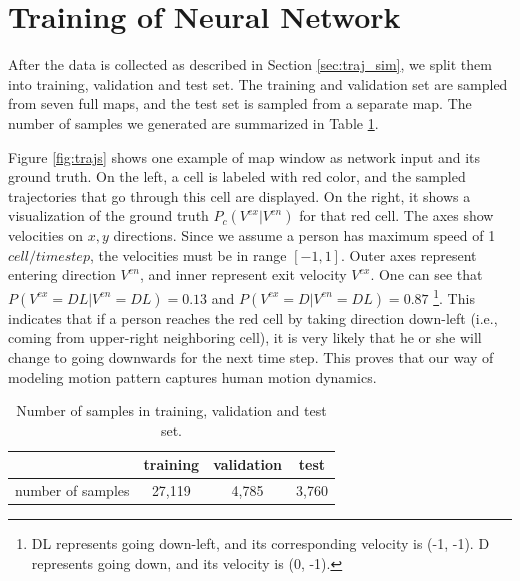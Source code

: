 \section{Training of Neural Network} \label{sec:train_cnn}

After the data is collected as described in Section \ref{sec:traj_sim}, we split them into training, validation and test set. The training and validation set are sampled from seven full maps, and the test set is sampled from a separate map. The number of samples we generated are summarized in Table \ref{table:nos}. 

Figure \ref{fig:trajs} shows one example of map window as network input and its ground truth. On the left, a cell is labeled with red color, and the sampled trajectories that go through this cell are displayed. On the right, it shows a visualization of the ground truth \( P_c(V^{ex} | V^{en}) \) for that red cell. The axes show velocities on \( x, y\) directions. Since we assume a person has maximum speed of 1 $cell/timestep$, the velocities must be in range $[-1,1]$. Outer axes represent entering direction \( V^{en} \), and inner represent exit velocity \( V^{ex} \). One can see that \( P(V^{ex}=DL | V^{en}=DL) = 0.13 \) and \( P(V^{ex}=D | V^{en}=DL) = 0.87 \) \footnote{DL represents going down-left, and its corresponding velocity is (-1, -1). D represents going down, and its velocity is (0, -1).}. This indicates that if a person reaches the red cell by taking direction down-left (i.e., coming from upper-right neighboring cell), it is very likely that he or she will change to going downwards for the next time step. This proves that our way of modeling motion pattern captures human motion dynamics.

\begin{table}[H]
\centering
  \begin{tabular}{c|ccc}
    \hline
     & training & validation & test \\ \hline
    number of samples & 27,119 & 4,785 & 3,760\\
    \hline
  \end{tabular}
\caption{Number of samples in training, validation and test set.}
\label{table:nos}
\end{table}

